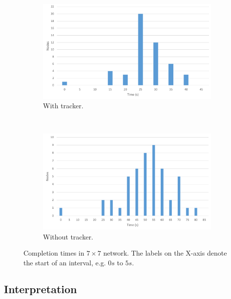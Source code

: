 \begin{figure}
	\centering
	\begin{subfigure}[b]{\textwidth}
		\centering
		\includegraphics[width=\linewidth]{graphs/scale/tracker-7x7-completion.pdf}
		\caption{With tracker.}
		\label{fig:eval:scale:7x7:tracker}
	\end{subfigure}%
	\\
	\begin{subfigure}[b]{\textwidth}
		\centering
		\includegraphics[width=\linewidth]{graphs/scale/no-tracker-7x7-completion.pdf}
		\caption{Without tracker.}
		\label{fig:eval:scale:7x7:no-tracker}
	\end{subfigure}
	\caption[Completion times in $7 \times 7$ network]{Completion times in $7 \times 7$ network. The labels on the X-axis denote the start of an interval, e.g. $0s$ to $5s$.}
	\label{fig:eval:scale:7x7}
\end{figure}

\subsection{Interpretation}
